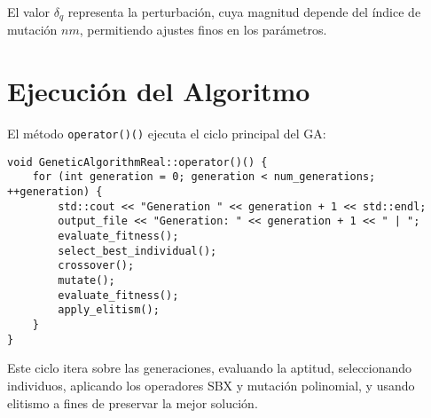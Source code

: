 El valor \(\delta_q\) representa la perturbación, cuya magnitud depende del índice de mutación \(nm\), permitiendo ajustes finos en los parámetros.

\section{Ejecución del Algoritmo}
\label{sec:ejecucion}

El método \texttt{operator()()} ejecuta el ciclo principal del GA:

\begin{lstlisting}[style=cppstyle, caption={Ciclo principal del algoritmo}, label={lst:ga_run}]
void GeneticAlgorithmReal::operator()() {
    for (int generation = 0; generation < num_generations; ++generation) {
        std::cout << "Generation " << generation + 1 << std::endl;
        output_file << "Generation: " << generation + 1 << " | ";
        evaluate_fitness();
        select_best_individual();
        crossover();
        mutate();
        evaluate_fitness();
        apply_elitism();
    }
}
\end{lstlisting}

Este ciclo itera sobre las generaciones, evaluando la aptitud, seleccionando individuos, aplicando los operadores SBX y mutación polinomial,
y usando elitismo a fines de preservar la mejor solución.
